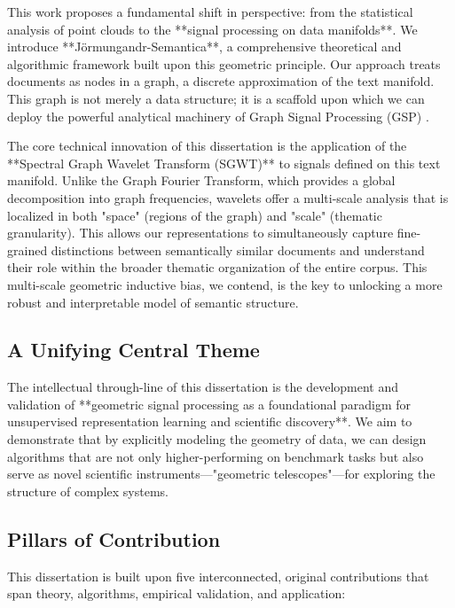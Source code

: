 This work proposes a fundamental shift in perspective: from the statistical analysis of point clouds to the **signal processing on data manifolds**. We introduce **Jörmungandr-Semantica**, a comprehensive theoretical and algorithmic framework built upon this geometric principle. Our approach treats documents as nodes in a graph, a discrete approximation of the text manifold. This graph is not merely a data structure; it is a scaffold upon which we can deploy the powerful analytical machinery of Graph Signal Processing (GSP) \citep{shuman2013emerging}.

The core technical innovation of this dissertation is the application of the **Spectral Graph Wavelet Transform (SGWT)** \citep{hammond2011wavelets} to signals defined on this text manifold. Unlike the Graph Fourier Transform, which provides a global decomposition into graph frequencies, wavelets offer a multi-scale analysis that is localized in both "space" (regions of the graph) and "scale" (thematic granularity). This allows our representations to simultaneously capture fine-grained distinctions between semantically similar documents and understand their role within the broader thematic organization of the entire corpus. This multi-scale geometric inductive bias, we contend, is the key to unlocking a more robust and interpretable model of semantic structure.

\subsection{A Unifying Central Theme}
The intellectual through-line of this dissertation is the development and validation of **geometric signal processing as a foundational paradigm for unsupervised representation learning and scientific discovery**. We aim to demonstrate that by explicitly modeling the geometry of data, we can design algorithms that are not only higher-performing on benchmark tasks but also serve as novel scientific instruments—"geometric telescopes"—for exploring the structure of complex systems.

\subsection{Pillars of Contribution}
This dissertation is built upon five interconnected, original contributions that span theory, algorithms, empirical validation, and application:

